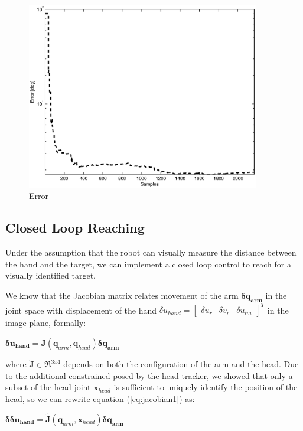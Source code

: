 \begin{figure}[tbp]
\label{fig:reaching-error}
\centerline{
\includegraphics[width=4.0in, angle=0 ]{./Figure/reachingError1.eps}
} \caption{Error} 
\end{figure}

\subsection{Closed Loop Reaching}
%
Under the assumption that the robot can visually measure the distance
between the hand and the target, we can implement a closed loop 
control to reach for a visually identified target.

We know that the Jacobian matrix relates movement of the arm 
$\mathbf{\delta q_{arm}}$ in the 
joint space with displacement of the hand 
\begin{math}\delta u_{hand}=
\left[ \begin{array}{ccc}
  \delta u_r & \delta v_r & \delta u_{lm}
\end{array} \right]^T\end{math} 
in the image plane, formally:
%
\begin{center} 
\begin{math}
\label{eq:jacobian1}
  \mathbf{\delta u_{hand}}=
  \tilde{\mathbf J}\left(\mathbf q_{arm}, \mathbf q_{head}\right)
  \mathbf{\delta q_{arm}}
\end{math}
\end{center}
%
where $\tilde{\mathbf J} \in \Re^{3x4}$ depends on 
both the configuration of the arm and the head. Due to the 
additional constrained posed by the head tracker, we showed
that only a subset of the head joint $\mathbf x_{head}$ is 
sufficient to uniquely identify the position of the head, so we 
can rewrite equation (\ref{eq:jacobian1}) as:
%
\begin{center} 
\begin{math}
\label{eq:jacobian2}
  \mathbf{\delta \delta u_{hand}}=
  \tilde{\mathbf J}\left(\mathbf q_{arm}, \mathbf x_{head}\right)
  \mathbf{\delta q_{arm}}
\end{math}
\end{center}
%

